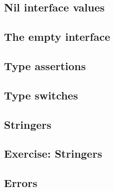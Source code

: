 \subsection{Nil interface values}




\subsection{The empty interface}




\subsection{Type assertions}




\subsection{Type switches}




\subsection{Stringers}




\subsection{Exercise: Stringers}


% 

\subsection{Errors}




